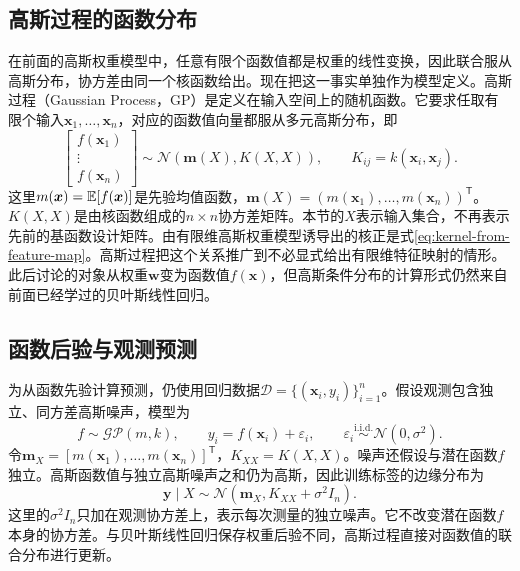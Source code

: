 \subsection{高斯过程的函数分布}
在前面的高斯权重模型中，任意有限个函数值都是权重的线性变换，因此联合服从高斯分布，协方差由同一个核函数给出。现在把这一事实单独作为模型定义。高斯过程（Gaussian Process，GP）是定义在输入空间上的随机函数。它要求任取有限个输入$\bm x_1,\ldots,\bm x_n$，对应的函数值向量都服从多元高斯分布，即
\begin{equation}
 \begin{bmatrix}f(\bm x_1)\\\vdots\\f(\bm x_n)\end{bmatrix}
 \sim\mathcal N\left(\bm m(X),K(X,X)\right),
 \qquad K_{ij}=k(\bm x_i,\bm x_j).
 \label{eq:gp-definition}
\end{equation}
这里$m(\bm x)=\mathbb{E}[f(\bm x)]$是先验均值函数，$\bm m(X)=(m(\bm x_1),\ldots,m(\bm x_n))^{\mathsf T}$。$K(X,X)$是由核函数组成的$n\times n$协方差矩阵。本节的$X$表示输入集合，不再表示先前的基函数设计矩阵。由有限维高斯权重模型诱导出的核正是式\eqref{eq:kernel-from-feature-map}。高斯过程把这个关系推广到不必显式给出有限维特征映射的情形。此后讨论的对象从权重$\bm w$变为函数值$f(\bm x)$，但高斯条件分布的计算形式仍然来自前面已经学过的贝叶斯线性回归。

\subsection{函数后验与观测预测}
为从函数先验计算预测，仍使用回归数据$\mathcal D=\{(\bm x_i,y_i)\}_{i=1}^n$。假设观测包含独立、同方差高斯噪声，模型为
\begin{equation}
 f\sim\mathcal{GP}(m,k),
 \qquad y_i=f(\bm x_i)+\varepsilon_i,
 \qquad \varepsilon_i\overset{\mathrm{i.i.d.}}\sim\mathcal N(0,\sigma^2).
 \label{eq:gp-observation-model}
\end{equation}
令$\bm m_X=[m(\bm x_1),\ldots,m(\bm x_n)]^{\mathsf T}$，$K_{XX}=K(X,X)$。噪声还假设与潜在函数$f$独立。高斯函数值与独立高斯噪声之和仍为高斯，因此训练标签的边缘分布为
\begin{equation}
 \bm y\mid X\sim\mathcal N\left(\bm m_X,K_{XX}+\sigma^2I_n\right).
 \label{eq:gp-marginal-likelihood}
\end{equation}
这里的$\sigma^2I_n$只加在观测协方差上，表示每次测量的独立噪声。它不改变潜在函数$f$本身的协方差。与贝叶斯线性回归保存权重后验不同，高斯过程直接对函数值的联合分布进行更新。

